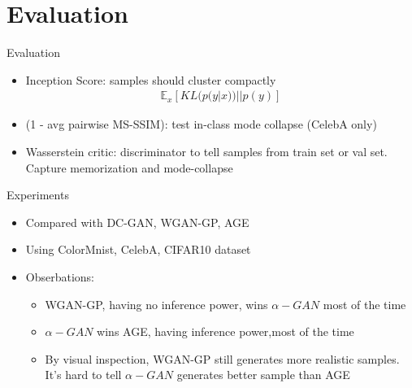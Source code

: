 \documentclass[compress]{beamer}
\newcommand{\expects}[2]{\mathbb{E}_{#1} \left[ #2 \right]}
\begin{document}
\section{Evaluation}
\begin{frame}[t]{Evaluation}
    \begin{itemize}
        \item Inception Score: samples should cluster compactly
            \begin{align*}
                \expects{x}{KL(p(y|x))||p(y)}
            \end{align*}
        \item (1 - avg pairwise MS-SSIM):  test in-class mode collapse (CelebA only)
        \item Wasserstein critic: discriminator to tell samples from train set or val set. Capture memorization and mode-collapse
    \end{itemize}
\end{frame}


\begin{frame}[t]{Experiments}
    \begin{itemize}
        \item Compared with DC-GAN, WGAN-GP, AGE
        \item Using ColorMnist, CelebA, CIFAR10 dataset
        \item Obserbations:
            \begin{itemize}
                \item WGAN-GP, having no inference power, wins $\alpha-GAN$ most of the time
                \item $\alpha-GAN$ wins AGE, having inference power,most of the time
                \item By visual inspection, WGAN-GP still generates more realistic samples. It's hard to tell $\alpha-GAN$ generates better sample than AGE
            \end{itemize}
    \end{itemize}
\end{frame}





\end{document}
